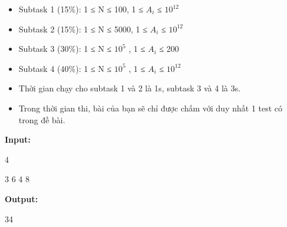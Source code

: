 \begin{itemize}
	\item     Subtask 1 (15\%): 1 ≤ N ≤ 100, 1 ≤ $A_{i}$    ≤ $10^{12}$
	\item     Subtask 2 (15\%): 1 ≤ N ≤ 5000, 1 ≤ $A_{i}$    ≤ $10^{12}$
	\item     Subtask 3 (30\%): 1 ≤ N ≤ $10^{5}$    , 1 ≤ $A_{i}$    ≤ 200   
	\item     Subtask 4 (40\%): 1 ≤ N ≤ $10^{5}$    , 1 ≤ $A_{i}$    ≤ $10^{12}$
	\item     Thời gian chạy cho subtask 1 và 2 là 1s, subtask 3 và 4 là 3s.   
\end{itemize}
\begin{itemize}
	\item     Trong thời gian thi, bài của bạn sẽ chỉ được chấm với duy nhất 1 test có trong đề bài.   
\end{itemize}
\textbf{    Input:   }

   4   


   3 6 4 8  

\textbf{    Output:   }

   34